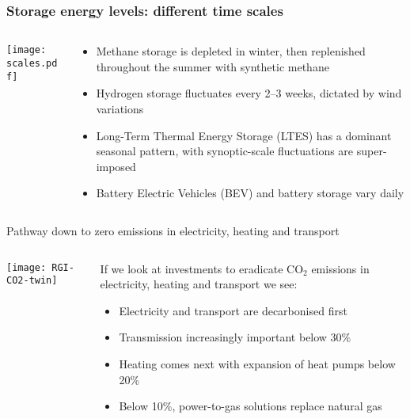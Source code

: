 \documentclass[10pt,aspectratio=169,dvipsnames]{beamer}
\def\co2{CO${}_2$}
\let\olditem\item
\renewcommand{\item}{%
\olditem\vspace{5pt}}
\begin{document}
\begin{frame}
  \frametitle{Storage energy levels: different time scales}

\begin{columns}[T]
  \begin{column}{9cm}

    \vspace{0.5cm}
  \texttt{[image: scales.pdf]}

  \end{column}

  \begin{column}{6cm}
    \begin{itemize}
    \item Methane storage is depleted in winter, then replenished
      throughout the summer with synthetic methane
    \item Hydrogen storage fluctuates every 2–3 weeks, dictated by
      wind variations
    \item Long-Term Thermal Energy Storage (LTES) has a dominant
      seasonal pattern, with synoptic-scale fluctuations are
      super-imposed
    \item Battery Electric Vehicles (BEV) and battery storage
      vary daily
    \end{itemize}

  \end{column}

\end{columns}
\end{frame}





\begin{frame}{Pathway down to zero emissions in electricity, heating and transport}
\begin{columns}[T]
  \begin{column}{9cm}

    \texttt{[image: RGI-CO2-twin]}

  \end{column}


  \begin{column}{6cm}

    \vspace{0.5cm}

    If we look at investments to eradicate \co2{} emissions in
    electricity, heating and transport we see:

    \begin{itemize}
    \item Electricity and transport are decarbonised first
    \item Transmission increasingly important below 30\%
    \item Heating comes next with expansion of heat pumps below 20\%
    \item Below 10\%, power-to-gas solutions replace natural gas
    \end{itemize}

  \end{column}

\end{columns}

\end{frame}
\end{document}
